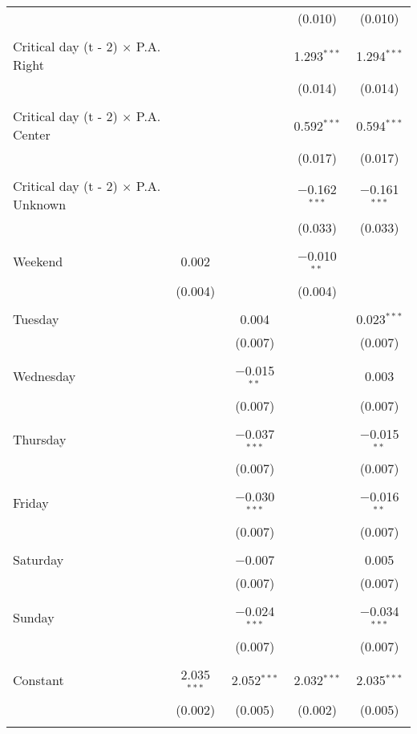 \documentclass[
]{article}
\begin{document}
\begin{table}[!htbp]
{\begin{tabular}{@{\extracolsep{5pt}}lcccc}
  &  &  & (0.010) & (0.010) \\ 
  & & & & \\ 
 Critical day (t - 2) $\times$ P.A. Right &  &  & 1.293$^{***}$ & 1.294$^{***}$ \\ 
  &  &  & (0.014) & (0.014) \\ 
  & & & & \\ 
 Critical day (t - 2) $\times$ P.A. Center &  &  & 0.592$^{***}$ & 0.594$^{***}$ \\ 
  &  &  & (0.017) & (0.017) \\ 
  & & & & \\ 
 Critical day (t - 2) $\times$ P.A. Unknown &  &  & $-$0.162$^{***}$ & $-$0.161$^{***}$ \\ 
  &  &  & (0.033) & (0.033) \\ 
  & & & & \\ 
 Weekend & 0.002 &  & $-$0.010$^{**}$ &  \\ 
  & (0.004) &  & (0.004) &  \\ 
  & & & & \\ 
 Tuesday &  & 0.004 &  & 0.023$^{***}$ \\ 
  &  & (0.007) &  & (0.007) \\ 
  & & & & \\ 
 Wednesday &  & $-$0.015$^{**}$ &  & 0.003 \\ 
  &  & (0.007) &  & (0.007) \\ 
  & & & & \\ 
 Thursday &  & $-$0.037$^{***}$ &  & $-$0.015$^{**}$ \\ 
  &  & (0.007) &  & (0.007) \\ 
  & & & & \\ 
 Friday &  & $-$0.030$^{***}$ &  & $-$0.016$^{**}$ \\ 
  &  & (0.007) &  & (0.007) \\ 
  & & & & \\ 
 Saturday &  & $-$0.007 &  & 0.005 \\ 
  &  & (0.007) &  & (0.007) \\ 
  & & & & \\ 
 Sunday &  & $-$0.024$^{***}$ &  & $-$0.034$^{***}$ \\ 
  &  & (0.007) &  & (0.007) \\ 
  & & & & \\ 
 Constant & 2.035$^{***}$ & 2.052$^{***}$ & 2.032$^{***}$ & 2.035$^{***}$ \\ 
  & (0.002) & (0.005) & (0.002) & (0.005) \\ 
  & & & & \\ 

\end{tabular}}
\end{table}
\end{document}
